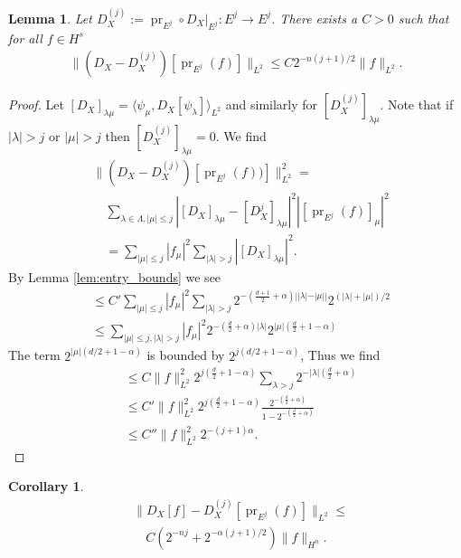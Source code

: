 \documentclass[letterpaper, 12 pt]{amsart}
\newtheorem{cor}[thm]{Corollary}
\newtheorem{lem}[thm]{Lemma}
\DeclareMathOperator{\pr}{pr}
\begin{document}
\begin{lem}  \label{lem:L2_to_Hn}
  Let $D_X^{(j)} := \pr_{E^j} \circ \left. D_X \right|_{E^j} : E^j \to E^j$.
  There exists a $C>0$ such that for all $f \in H^s$
  \begin{align}
    \| (D_X - D_X^{(j)})[\pr_{E^j}(f)] \|_{L^2} \leq C 2^{-n(j+1)/2} \| f\|_{L^2}.
  \end{align}
\end{lem}
\begin{proof}
  Let $[D_X]_{\lambda\mu} = \langle \psi_{\mu} , D_X[\psi_\lambda] \rangle_{L^2}$
and similarly for $[D_X^{(j)}]_{\lambda \mu}$.
Note that if $|\lambda|>j$ or $|\mu |>j$ then $[D_X^{(j)}]_{\lambda\mu} = 0$.
We find
  \begin{align*}
    &\| (D_X - D_X^{(j)}) [\pr_{E^j}(f))] \|^2_{L^2} = \\
    &\quad \sum_{\lambda \in \Lambda, |\mu | \leq j} \left| [D_X]_{\lambda\mu} - [D_X^j]_{\lambda\mu} \right|^2 |[ \pr_{E^j}(f)]_\mu|^2 \\
    &\quad = \sum_{|\mu|\leq j}| f_\mu |^2 \sum_{|\lambda| > j} | [D_X]_{\lambda\mu}|^2.
  \end{align*}
  By Lemma \ref{lem:entry_bounds} we see
  \begin{align*}
    &\leq C' \sum_{|\mu|\leq j} | f_\mu |^2  \sum_{|\lambda| > j } 
    2^{- \left( \frac{d+1}{2} + \alpha \right) | |\lambda| - |\mu| |}
    2^{ (|\lambda| + |\mu|)/2 }\\
    &\leq \sum_{|\mu | \leq j , |\lambda| > j}
    |f_\mu|^2 2^{ - \left( \frac{d}{2} + \alpha \right)|\lambda|} 
    2^{|\mu|\left(\frac{d}{2} + 1 - \alpha\right) }
  \end{align*}
  The term $2^{|\mu|( d/2 + 1 - \alpha)}$ is bounded 
  by $ 2^{j(d/2 + 1 - \alpha)}$,
  Thus we find
  \begin{align*}
    &\leq C \|f\|_{L^2}^2 2^{j \left( \frac{d}{2} + 1 - \alpha\right)} \sum_{\lambda > j}
      2^{-|\lambda|\left( \frac{d}{2} + \alpha\right)} \\
    &\leq C' \|f\|_{L^2}^2 2^{j \left( \frac{d}{2} + 1 - \alpha\right)}
    \frac{ 2^{ -\left(\frac{d}{2} + \alpha \right)}}{ 1 - 2^{-\left(\frac{d}{2} + \alpha\right)}} \\
    &\leq C'' \|f\|_{L^2}^2 2^{-(j+1) \alpha}.
  \end{align*}
\end{proof}
  \begin{cor} \label{cor:operator_bound}
    \begin{align*}
      &\| D_X [f] - D_X^{(j)} [\pr_{E^j}(f)] \|_{L^2} \leq \\
      &\quad C \left( 2^{-nj} + 2^{-\alpha(j+1)/2} \right) \|f\|_{H^n}.
    \end{align*}
  \end{cor}
\end{document}
